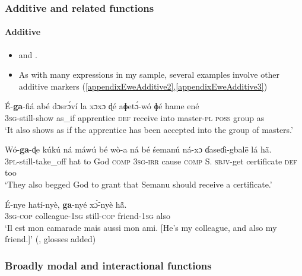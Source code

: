 \subsubsection{Additive and related functions}
\paragraph{Additive}\label{appendixEweAdditive}
\begin{itemize}
	\item \textcite[468]{Rongier2015} and \textcite[153]{Westermann1905}.
	\item As with many expressions in my sample, several examples involve other additive markers (\ref{appendixEweAdditive2},\ref{appendixEweAdditive3})
\end{itemize}
\begin{exe}
	\ex
	\gll É-\textbf{ga}-fiá abé dɔsrɔ́ví la xɔxɔ ɖé aɸetɔ́-wó ɸé hame ené\\
	3\textsc{sg}-still-show as\_if apprentice \textsc{def} receive into master-\textsc{pl} \textsc{poss} group as\\
	\glt \lq It also shows as if the apprentice has been accepted into the group of masters.' \parencite[63]{Ameka1991}

	\ex\label{appendixEweAdditive2}
	\gll Wó-\textbf{ga}-ɖe kúkú ná máwú bé wò-a ná bé śemanú ná-xɔ ɗaseɗi-gbalē lá hã.\\
	3\textsc{pl}-still-take\_off hat to  God \textsc{comp} 3\textsc{sg}-\textsc{irr} cause \textsc{comp} S. \textsc{sbjv}-get certificate \textsc{def} too\\
	\glt \lq They also begged God to grant that Semanu should receive a certificate.' \parencite[612]{Ameka1991}

	\ex\label{appendixEweAdditive3}
	\gll É-nye hatí-nyè, \textbf{ga}-nyé xɔ̃́-nyè hã̂.\\
3\textsc{sg}-\textsc{cop} colleague-1\textsc{sg} still-\textsc{cop} friend-1\textsc{sg} also\\
	\glt \lq Il est mon camarade mais aussi mon ami. [He's my colleague, and also my friend.]' (\cite[153]{Westermann1905}, glosses added)
\end{exe}

\subsubsection{Broadly modal and interactional functions}
